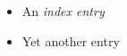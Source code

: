 \documentclass{article}
\begin{document}
\begin{itemize}
    \item An {\it index entry}
    \item {Yet another entry}
\end{itemize}

\printindex
\end{document}
